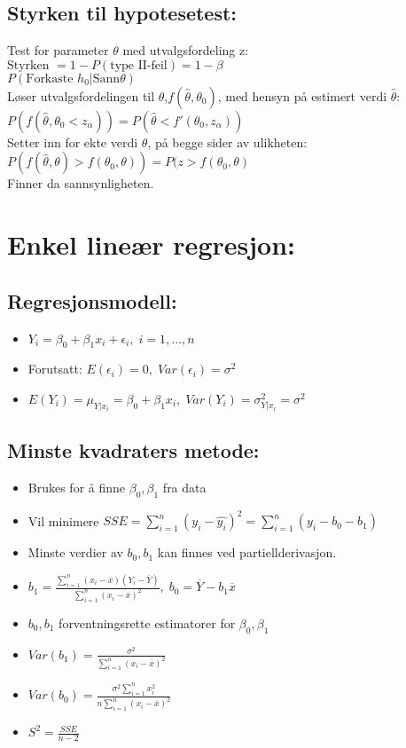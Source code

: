 \documentclass[12pt,a4paper,twocolumn,twoside]{article}
\begin{document}
\subsection*{Styrken til hypotesetest:}
Test for parameter $\theta$ med utvalgsfordeling z:\\
$\text{Styrken }=1-P(\text{type II-feil})=1-\beta$\\
$P(\text{Forkaste }h_0|\text{Sann} \theta)$\\
Løser utvalgsfordelingen til $\theta$,$f(\hat\theta,\theta_0)$, med hensyn på estimert verdi $\hat\theta$:\\
$P(f(\hat\theta,\theta_0<z_\alpha))=P(\hat{\theta}<f'(\theta_0,z_\alpha))$\\
Setter inn for ekte verdi $\theta$, på begge sider av ulikheten:\\
$P(f(\hat\theta,\theta)>f(\theta_0,\theta))=P(z>f(\theta_0,\theta)$\\
Finner da sannsynligheten.
%
%
\section*{Enkel lineær regresjon:}
\subsection*{Regresjonsmodell:}
\begin{itemize}[topsep=0pt,itemsep=0pt, partopsep=0pt]
    \item $Y_i=\beta_0+\beta_1x_i+\epsilon_i,\;i=1,\dots,n$
    \item Forutsatt: $E(\epsilon_i) = 0,\;Var(\epsilon_i)=\sigma^2$
    \item $E(Y_i)=\mu_{Y|x_i}=\beta_0+\beta_1x_i,\;Var(Y_i)=\sigma^2_{Y|x_i}=\sigma^2$
\end{itemize}
\subsection*{Minste kvadraters metode:}
\begin{itemize}[topsep=0pt,itemsep=0pt, partopsep=0pt]
    \item Brukes for å finne $\beta_0,\beta_1$ fra data
    \item Vil minimere $SSE=\sum_{i=1}^n(y_i-\hat{y_i})^2=\sum_{i=1}^n(y_i-b_0-b_1)$
    \item Minste verdier av $b_0,b_1$ kan finnes ved partiellderivasjon.
    \item $b_1=\frac{\sum_{i=1}^n(x_i-\overline{x})(Y_i-\overline{Y})}{\sum_{i=1}^n(x_i-\overline{x})^2},\; b_0=\overline{Y}-b_1\overline{x}$
    \item $b_0, b_1$ forventningsrette estimatorer for $\beta_0,\beta_1$
    \item $Var(b_1)=\frac{\sigma^2}{\sum_{i=1}^n (x_i-\overline{x})^2}$
    \item $Var(b_0)=\frac{\sigma^2\sum_{i=1}^nx_i^2}{n\sum_{i=1}^n(x_i-\overline{x})^2}$
    \item $S^2=\frac{SSE}{n-2}$
\end{itemize}
\end{document}

